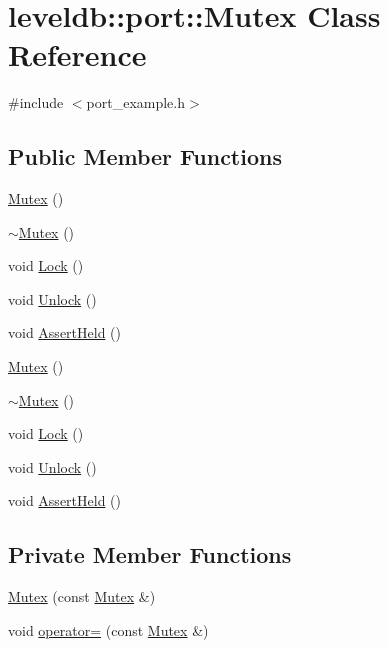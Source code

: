 \hypertarget{classleveldb_1_1port_1_1_mutex}{\section{leveldb\-:\-:port\-:\-:Mutex Class Reference}
\label{classleveldb_1_1port_1_1_mutex}
}


{\ttfamily \#include $<$port\-\_\-example.\-h$>$}

\subsection*{Public Member Functions}
\begin{DoxyCompactItemize}
\item 
\hyperlink{classleveldb_1_1port_1_1_mutex_ab8f26966b881db1fd96839df85e5c583}{Mutex} ()
\item 
\hyperlink{classleveldb_1_1port_1_1_mutex_a86acffb44e6134be2e8398e6f3be6abc}{$\sim$\-Mutex} ()
\item 
void \hyperlink{classleveldb_1_1port_1_1_mutex_a9a4da7195ce1802c077bc4d0035d4dd1}{Lock} ()
\item 
void \hyperlink{classleveldb_1_1port_1_1_mutex_a9d69a21c53dad7732b2006acf87f006b}{Unlock} ()
\item 
void \hyperlink{classleveldb_1_1port_1_1_mutex_a9793393529f59bbb4adaf152bbbab42c}{Assert\-Held} ()
\item 
\hyperlink{classleveldb_1_1port_1_1_mutex_ab8f26966b881db1fd96839df85e5c583}{Mutex} ()
\item 
\hyperlink{classleveldb_1_1port_1_1_mutex_a86acffb44e6134be2e8398e6f3be6abc}{$\sim$\-Mutex} ()
\item 
void \hyperlink{classleveldb_1_1port_1_1_mutex_a9a4da7195ce1802c077bc4d0035d4dd1}{Lock} ()
\item 
void \hyperlink{classleveldb_1_1port_1_1_mutex_a9d69a21c53dad7732b2006acf87f006b}{Unlock} ()
\item 
void \hyperlink{classleveldb_1_1port_1_1_mutex_a9793393529f59bbb4adaf152bbbab42c}{Assert\-Held} ()
\end{DoxyCompactItemize}
\subsection*{Private Member Functions}
\begin{DoxyCompactItemize}
\item 
\hyperlink{classleveldb_1_1port_1_1_mutex_aef1267808fd5d071174c9a9a98bc9798}{Mutex} (const \hyperlink{classleveldb_1_1port_1_1_mutex}{Mutex} \&)
\item 
void \hyperlink{classleveldb_1_1port_1_1_mutex_a6d3f217248224b85ca092f6303b926c5}{operator=} (const \hyperlink{classleveldb_1_1port_1_1_mutex}{Mutex} \&)
\end{DoxyCompactItemize}
